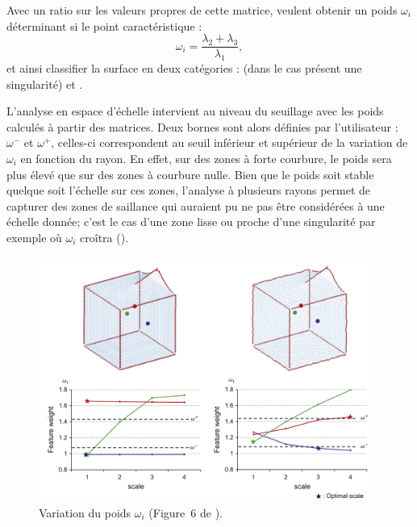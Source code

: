 Avec un ratio sur les valeurs propres de cette matrice,  veulent
obtenir un poids $\omega_i$ déterminant si le point caractéristique :
%
\begin{equation}
  \omega_i = \frac{\lambda_2 + \lambda_3}{\lambda_1},
\end{equation}
%
et ainsi classifier la surface en deux catégories : \Feature (\cad dans le cas
présent une singularité) et \NonFeature.


L'analyse en espace d'échelle intervient au niveau du seuillage avec les poids
calculés à partir des matrices. Deux bornes sont alors définies par
l'utilisateur : $\omega^-$ et $\omega^+$, celles-ci correspondent au seuil
inférieur et supérieur de la variation de $\omega_i$ en fonction du rayon. En
effet, sur des zones à forte courbure, le poids sera plus élevé que sur des
zones à courbure nulle. Bien que le poids soit stable quelque soit l'échelle sur
ces zones, l'analyse à plusieurs rayons permet de capturer des zones de
saillance qui auraient pu ne pas être considérées à une échelle donnée; c'est le
cas d'une zone lisse ou proche d'une singularité par exemple où $\omega_i$ croîtra
().

\begin{figure}[ht]{
    \begin{center}
    \includegraphics[height=8cm]{images/Feature/Tensor_weight}
    \end{center}}
    \caption[Variation du poids $\omega_i$.]{Variation du poids $\omega_i$ (Figure~6 de \cite{Park2012}).
      \label{fig:tensor-weight}}
\end{figure}

